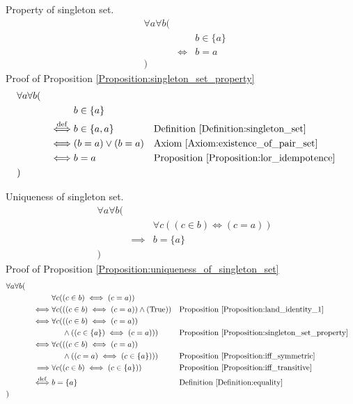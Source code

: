 \begin{prop}
\label{Proposition:singleton_set_property}
Property of singleton set.
\begin{align*}
& \forall a \forall b ( \\
& & & b \in \{ a \} \\
& & \iff & b = a \\
& )
\end{align*}
Proof of Proposition \ref{Proposition:singleton_set_property}
\begin{align*}
& \forall a \forall b ( \\
& & & b \in \{ a \} \\
& & \overset{\operatorname{def}}{\iff} & b \in \{ a , a \}
& & \text{Definition \ref{Definition:singleton_set}} \\
& & \iff & (b = a) \lor (b = a)
& & \text{Axiom \ref{Axiom:existence_of_pair_set}} \\
& & \iff & b = a
& & \text{Proposition \ref{Proposition:lor_idempotence}} \\
& )
\end{align*}
\end{prop}

\begin{prop}
\label{Proposition:uniqueness_of_singleton_set}
Uniqueness of singleton set.
\begin{align*}
& \forall a \forall b ( \\
& & & \forall c ((c \in b) \iff (c = a)) \\
& & \implies & b = \{ a \} \\
& )
\end{align*}
Proof of Proposition \ref{Proposition:uniqueness_of_singleton_set}
\begin{align*}
& \forall a \forall b ( \\
& & & \forall c ((c \in b) \iff (c = a)) \\
& & \iff & \forall c (((c \in b) \iff (c = a)) \land (\text{True}))
& & \text{Proposition \ref{Proposition:land_identity_1}} \\
& & \iff & \forall c (((c \in b) \iff (c = a)) \\
& & & \phantom{\forall c (} \land ((c \in \{ a \}) \iff (c = a)))
& & \text{Proposition \ref{Proposition:singleton_set_property}} \\
& & \iff & \forall c (((c \in b) \iff (c = a)) \\
& & & \phantom{\forall c (} \land ((c = a) \iff (c \in \{ a \})))
& & \text{Proposition \ref{Proposition:iff_symmetric}} \\
& & \implies & \forall c ((c \in b) \iff (c \in \{ a \}))
& & \text{Proposition \ref{Proposition:iff_transitive}} \\
& & \overset{\operatorname{def}}{\iff} & b = \{ a \}
& & \text{Definition \ref{Definition:equality}} \\
& )
\end{align*}
\end{prop}

